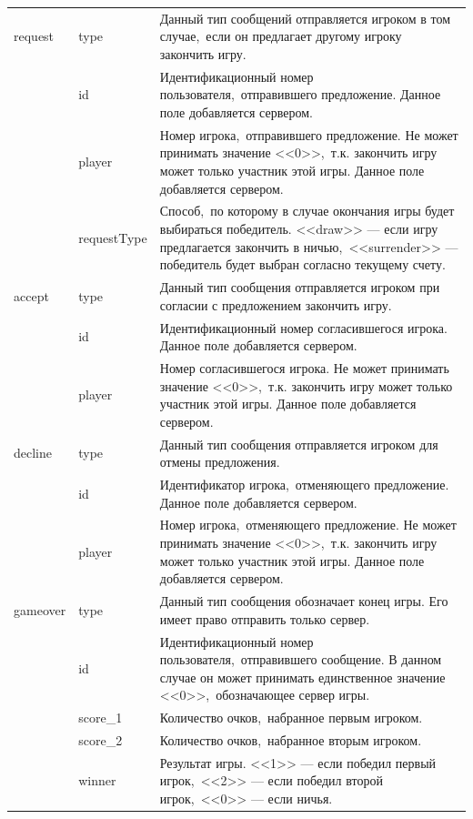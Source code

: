 \documentclass[14pt,a4paper]{report}
\begin{document}
\begin{longtable}{| l | l | p{11cm} |}
request & type & Данный тип сообщений отправляется игроком в том случае,~если он предлагает другому игроку закончить игру.\\*\cline{2-3}
 & id & Идентификационный номер пользователя,~отправившего предложение. Данное поле добавляется сервером.\\*\cline{2-3}
 & player & Номер игрока,~отправившего предложение. Не может принимать значение <<0>>,~т.к. закончить игру может только участник этой игры. Данное поле добавляется сервером.\\*\cline{2-3}
 & requestType & Способ,~по которому в случае окончания игры будет выбираться победитель. <<draw>> --- если игру предлагается закончить в ничью,~<<surrender>> --- победитель будет выбран согласно текущему счету.\\*\hline
accept & type & Данный тип сообщения отправляется игроком при согласии с предложением закончить игру.\\*\cline{2-3}
 & id & Идентификационный номер согласившегося игрока. Данное поле добавляется сервером.\\*\cline{2-3}
 & player & Номер согласившегося игрока. Не может принимать значение <<0>>,~т.к. закончить игру может только участник этой игры. Данное поле добавляется сервером.\\*\hline
decline & type & Данный тип сообщения отправляется игроком для отмены предложения.\\*\cline{2-3}
 & id & Идентификатор игрока,~отменяющего предложение. Данное поле добавляется сервером.\\*\cline{2-3}
 & player & Номер игрока,~отменяющего предложение. Не может принимать значение <<0>>,~т.к. закончить игру может только участник этой игры. Данное поле добавляется сервером.\\*\hline
gameover & type & Данный тип сообщения обозначает конец игры. Его имеет право отправить только сервер.\\*\cline{2-3}
 & id & Идентификационный номер пользователя,~отправившего сообщение. В данном случае он может принимать единственное значение <<0>>,~обозначающее сервер игры.\\*\cline{2-3}
 & score\_1 & Количество очков,~набранное первым игроком.\\*\cline{2-3}
 & score\_2 & Количество очков,~набранное вторым игроком.\\*\cline{2-3}
 & winner & Результат игры. <<1>> --- если победил первый игрок,~<<2>> --- если победил второй игрок,~<<0>> --- если ничья.\\*\hline
\end{longtable}
\end{document}
